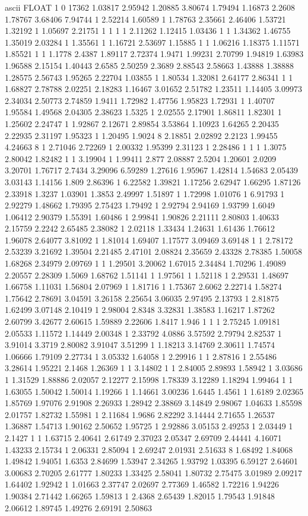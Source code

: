 ascii
FLOAT
1
0 17362 
1.03817 2.95942 1.20885 3.80674 1.79494 1.16873 2.2608 1.78767 3.68406 7.94744 1 2.52214 1.60589 1 1.78763 2.35661 2.46406 1.53721 1.32192 1 1.05697 2.21751 1 1 1 1 2.11262 1.12415 1.03436 1 1 1.34362 1.46755 1.35019 2.03284 1 1.35561 1 1.16721 2.53697 1.15885 1 1 1.06216 1.18375 1.11571 1.85521 1 1 1.1778 2.4387 1.89117 2.72374 1.9471 1.99231 2.70799 1.94819 1.63983 1.96588 2.15154 1.40443 2.6585 2.50259 2.3689 2.88543 2.58663 1.43888 1.38888 1.28575 2.56743 1.95265 2.22704 1.03855 1 1.80534 1.32081 2.64177 2.86341 1 1 1.68827 2.78788 2.02251 2.18283 1.16467 3.01652 2.51782 1.23511 1.14405 3.09973 2.34034 2.50773 2.74859 1.9411 1.72982 1.47756 1.95823 1.72931 1 1.40707 1.95584 1.49568 2.04305 2.38623 1.5325 1 2.02555 2.17901 1.86811 1.82301 1 1.25602 2.24747 1 1.92867 2.12671 2.89854 3.53864 1.10923 1.64265 2.20435 2.22935 2.31197 1.95323 1 1.20495 1.9024 8 2.18851 2.02892 2.2123 1.99455 4.24663 8 1 2.71046 2.72269 1 2.00332 1.95399 2.31123 1 2.28486 1 1 1 1.3075 2.80042 1.82482 1 1 3.19904 1 1.99411 2.877 2.08887 2.5204 1.20601 2.0209 3.20701 1.76717 2.7434 3.29096 6.59289 1.27616 1.95967 1.42814 1.54683 2.05439 3.03143 1.14156 1.809 2.86396 1 6.22582 1.39821 1.17256 2.62947 1.66295 1.87126 2.33918 1.3237 1.03901 1.3853 2.49997 1.51897 1 1.72998 1.01076 1 6.91793 1 2.92279 1.48662 1.79395 2.75423 1.79492 1 2.92794 2.94169 1.93799 1.6049 1.06412 2.90379 1.55391 1.60486 1 2.99841 1.90826 2.21111 2.80803 1.40633 2.15759 2.2242 2.65485 2.38082 1 2.02118 1.33434 1.24631 1.61436 1.76612 1.96078 2.64077 3.81092 1 1.81014 1.69407 1.17577 3.09469 3.69148 1 1 2.78172 2.53239 3.21692 1.39504 2.21485 2.47101 2.08824 2.35659 2.43328 2.78385 1.50058 1.68268 2.34979 2.09769 1 1 1.29501 3.20062 1.67015 2.34484 1.70296 1.49089 2.20557 2.28309 1.5069 1.68762 1.51141 1 1.97561 1 1.52118 1 2.29531 1.48697 1.66758 1.11031 1.56804 2.07969 1 1.81716 1 1.75367 2.6062 2.22714 1.58274 1.75642 2.78691 3.04591 3.26158 2.25654 3.06035 2.97495 2.13793 1 2.81875 1.62499 3.07148 2.10419 1 2.98004 2.8348 3.32831 1.38583 1.16217 1.87262 2.60799 3.42677 2.60615 1.59889 2.22606 1.8417 1.946 1 1 1 2.75245 1.09181 2.05533 1.11572 1.14449 2.00348 1 2.33792 4.0886 3.57592 2.79794 2.82537 1 3.91014 3.3719 2.80082 3.91047 3.51299 1 1.18213 3.14769 2.30611 1.74574 1.06666 1.79109 2.27734 1 3.05332 1.64058 1 2.29916 1 1 2.87816 1 2.55486 3.28614 1.95221 2.1468 1.26369 1 1 3.14802 1 1 2.84005 2.89893 1.58942 1 3.03686 1 1.31529 1.88886 2.02057 2.12277 2.15998 1.78339 3.12289 1.18294 1.99464 1 1 1.63055 1.50042 1.50014 1.19266 1 1.14661 3.00236 1.6445 1.4561 1 1.6189 2.02365 1.85769 1.97076 2.91908 2.26933 1.28942 2.38869 3.14849 2.98067 1.04633 1.85598 2.01757 1.82732 1.55981 1 2.11684 1.9686 2.82292 3.14444 2.71655 1.26537 1.36887 1.54713 1.90162 2.50652 1.95725 1 2.92886 3.05153 2.49253 1 2.03449 1 2.1427 1 1 1.63715 2.40641 2.61749 2.37023 2.05347 2.69709 2.44441 4.16071 1.43233 2.15734 1 2.06331 2.85094 1 2.69247 2.01931 2.51633 8 1.68492 1.84068 1.49842 1.94051 1.6353 2.84699 1.53947 2.34265 1.93792 1.03395 6.59127 2.64601 3.00683 2.70205 2.61777 1.80233 1.33425 2.58041 1.80732 2.75475 3.01989 2.09217 1.64402 1.92942 1 1.01663 2.37747 2.02697 2.77369 1.46582 1.72216 1.94226 1.90384 2.71442 1.66265 1.59813 1 2.4368 2.65439 1.82015 1.79543 1.91848 2.06612 1.89745 1.49276 2.69191 2.50863 